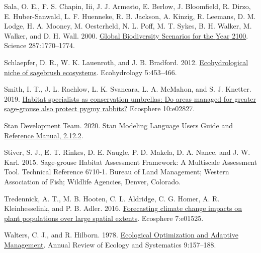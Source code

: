 \documentclass[
  12pt,
]{article}
\newlength{\cslhangindent}
\newlength{\cslentryspacingunit} %
\newenvironment{CSLReferences}[2] %
 {%
  \setlength{\parindent}{0pt}
  \ifodd #1
  \let\oldpar\par
  \def\par{\hangindent=\cslhangindent\oldpar}
  \fi
  \setlength{\parskip}{#2\cslentryspacingunit}
 }%
 {}
\begin{document}
\begin{CSLReferences}{1}{0}
\leavevmode{}%
Sala, O. E., F. S. Chapin, Iii, J. J. Armesto, E. Berlow, J. Bloomfield, R. Dirzo, E. Huber-Sanwald, L. F. Huenneke, R. B. Jackson, A. Kinzig, R. Leemans, D. M. Lodge, H. A. Mooney, M. Oesterheld, N. L. Poff, M. T. Sykes, B. H. Walker, M. Walker, and D. H. Wall. 2000. \href{https://doi.org/10.1126/science.287.5459.1770}{Global {Biodiversity} {Scenarios} for the {Year} 2100}. Science 287:1770--1774.

\leavevmode{}%
Schlaepfer, D. R., W. K. Lauenroth, and J. B. Bradford. 2012. \href{https://doi.org/10.1002/eco.238}{Ecohydrological niche of sagebrush ecosystems}. Ecohydrology 5:453--466.

\leavevmode{}%
Smith, I. T., J. L. Rachlow, L. K. Svancara, L. A. McMahon, and S. J. Knetter. 2019. \href{https://doi.org/10.1002/ecs2.2827}{Habitat specialists as conservation umbrellas: {Do} areas managed for greater sage-grouse also protect pygmy rabbits?} Ecosphere 10:e02827.

\leavevmode{}%
Stan Development Team. 2020. \href{https://mc-stan.org}{Stan {Modeling} {Language} {Users} {Guide} and {Reference} {Manual}, 2.12.2}.

\leavevmode{}%
Stiver, S. J., E. T. Rinkes, D. E. Naugle, P. D. Makela, D. A. Nance, and J. W. Karl. 2015. Sage-grouse {Habitat} {Assessment} {Framework}: {A} {Multiscale} {Assessment} {Tool}. {Technical} {Reference} 6710-1. Bureau of Land Management; Western Association of Fish; Wildlife Agencies, Denver, Colorado.

\leavevmode{}%
Tredennick, A. T., M. B. Hooten, C. L. Aldridge, C. G. Homer, A. R. Kleinhesselink, and P. B. Adler. 2016. \href{https://doi.org/10.1002/ecs2.1525}{Forecasting climate change impacts on plant populations over large spatial extents}. Ecosphere 7:e01525.

\leavevmode{}%
Walters, C. J., and R. Hilborn. 1978. \href{https://doi.org/10.1146/annurev.es.09.110178.001105}{Ecological {Optimization} and {Adaptive} {Management}}. Annual Review of Ecology and Systematics 9:157--188.

\end{CSLReferences}
\end{document}
